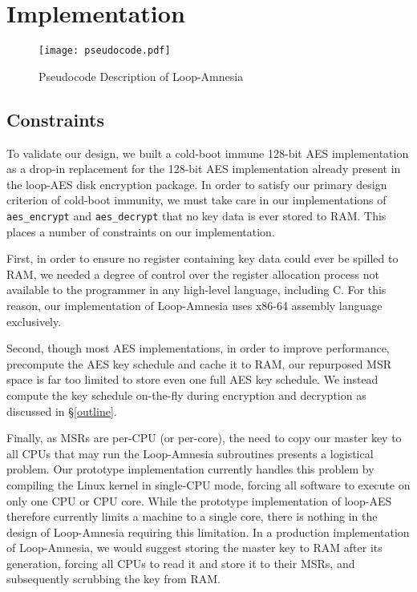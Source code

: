 \documentclass[letterpaper,twocolumn,nonatbib,10pt]{article}
\begin{document}
\section{Implementation}
\label{implicate}

\begin{figure*}[t]
\texttt{[image: pseudocode.pdf]}
\caption{Pseudocode Description of Loop-Amnesia}
\end{figure*}

\subsection{Constraints}

To validate our design, we built a cold-boot immune 128-bit AES
implementation as a drop-in replacement for the 128-bit AES
implementation already present in the loop-AES disk encryption
package.  In order to satisfy our primary design criterion of
cold-boot immunity, we must take care in our implementations of
\texttt{aes\_encrypt} and \texttt{aes\_decrypt} that no key data is
ever stored to RAM.  This places a number of constraints on our
implementation.

First, in order to ensure no register containing key data could ever
be spilled to RAM, we needed a degree of control over the register
allocation process not available to the programmer in any high-level
language, including C\@.  For this reason, our implementation of
Loop-Amnesia uses x86-64 assembly language exclusively.

Second, though most AES implementations, in order to improve
performance, precompute the AES key schedule and cache it to RAM, our
repurposed MSR space is far too limited to store even one full AES key
schedule.  We instead compute the key schedule on-the-fly during
encryption and decryption as discussed in \S\ref{outline}.

Finally, as MSRs are per-CPU (or per-core), the need to copy our
master key to all CPUs that may run the Loop-Amnesia subroutines
presents a logistical problem.  Our prototype implementation currently
handles this problem by compiling the Linux kernel in single-CPU mode,
forcing all software to execute on only one CPU or CPU core.  While
the prototype implementation of loop-AES therefore currently limits a
machine to a single core, there is nothing in the design of
Loop-Amnesia requiring this limitation.  In a production
implementation of Loop-Amnesia, we would suggest storing the master
key to RAM after its generation, forcing all CPUs to read it and store
it to their MSRs, and subsequently scrubbing the key from RAM.
\end{document}
